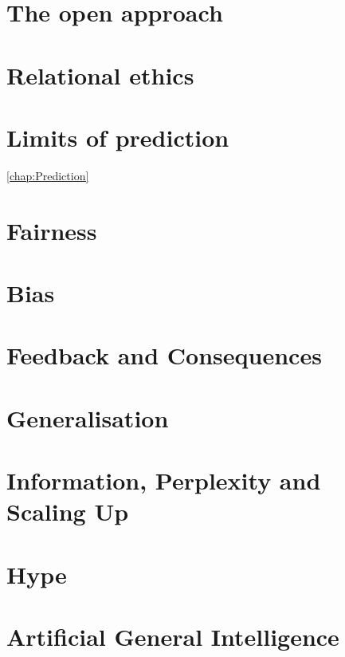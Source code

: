\documentclass[12pt]{book}
\begin{document}

%



\chapter{The open approach}
%

\label{chap:Open}



\chapter{Relational ethics}
%




\chapter{Limits of prediction}
%
\ref{chap:Prediction}




\chapter{Fairness}
%




\chapter{Bias}
%



%


\chapter{Feedback and Consequences}
%



%

\chapter{Generalisation}
%


\chapter{Information, Perplexity and Scaling Up}
%



\chapter{Hype}




\chapter{Artificial General Intelligence}
%




\backmatter
%


%

\end{document}
